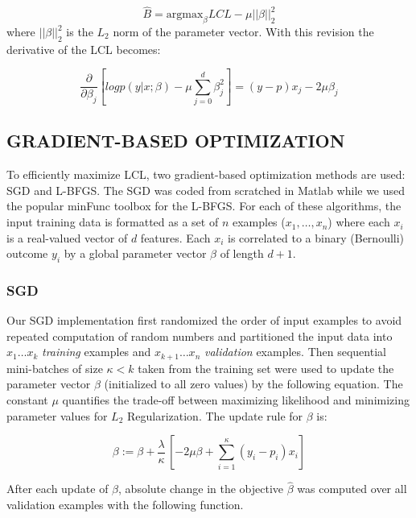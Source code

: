 \begin{equation}
    \hat{B} = \textrm{argmax}_{\beta} LCL - \mu||\beta||_2^2
\end{equation}
where $||\beta||_2^2$ is the $L_2$ norm of the parameter vector. With this revision the derivative of the LCL becomes:

\begin{equation}
    \frac{\partial}{\partial \beta_j} [ log p( y | x ; \beta) -\mu \sum_{j=0}^d \beta_j^2 ] = (y - p) x_j - 2 \mu \beta_j
\end{equation}


\subsection{GRADIENT-BASED OPTIMIZATION}
To efficiently maximize LCL, two gradient-based optimization methods are used: SGD and L-BFGS. The SGD was coded from scratched in Matlab while we used the popular minFunc toolbox \cite{minFunc} for the L-BFGS. For each of these algorithms, the input training data is formatted as a set of $n$ examples ($x_1, \ldots , x_n$) where each $x_i$ is a real-valued vector of $d$ features. Each $x_i$ is correlated to a binary (Bernoulli) outcome $y_i$ by a global parameter vector $\beta$ of length $d+1$. 


\subsubsection{SGD} 
Our SGD implementation first randomized the order of input examples to avoid repeated computation of random numbers and partitioned the input data into $x_1 \ldots x_k$ \emph{training} examples and $x_{k+1} \ldots x_n$ \emph{validation} examples. Then sequential mini-batches of size $\kappa < k$ taken from the training set were used to update the parameter vector $\beta$ (initialized to all zero values) by the following equation. The constant $\mu$ quantifies the trade-off between maximizing likelihood and minimizing parameter values for $L_2$ Regularization. The update rule for $\beta$ is:

\begin{equation}
    \beta := \beta + \frac{\lambda}{\kappa}\,[-2 \mu \beta + \sum_{i=1}^{\kappa} (y_i - p_i) x_i]
\end{equation}

After each update of $\beta$, absolute change in the objective $\widehat{\beta}$ was computed over all validation examples with the following function.

